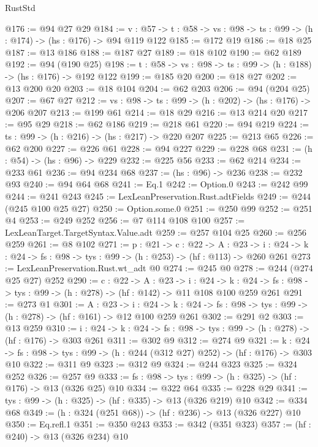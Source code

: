 \begin{lexlean}{RustStd}
\begin{coremodule}
@176 := @94 @27 @29
@184 := {v : @57} ->
  {t : @58} -> {vs : @98} -> {ts : @99} -> (h : @174) -> (hs : @176) -> @94 @119 @122
@185 := @172 @19
@186 := @18 @25
@187 := @13 @186
@188 := @187 @27
@189 := @18 @102
@190 := @62 @189
@192 := @94 (@190 @25)
@198 := {t : @58} -> {vs : @98} -> {ts : @99} -> (h : @188) -> (hs : @176) -> @192 @122
@199 := @185 @20
@200 := @18 @27
@202 := @13 @200 @20
@203 := @18 @104
@204 := @62 @203
@206 := @94 (@204 @25)
@207 := @67 @27
@212 := {vs : @98} -> {ts : @99} -> (h : @202) -> (hs : @176) -> @206 @207
@213 := @199 @61
@214 := @18 @29
@216 := @13 @214 @20
@217 := @95 @29
@218 := @62 @186
@219 := @218 @61
@220 := @94 @219
@224 := {ts : @99} -> (h : @216) -> (hs : @217) -> @220 @207
@225 := @213 @65
@226 := @62 @200
@227 := @226 @61
@228 := @94 @227
@229 := @228 @68
@231 := (h : @54) -> (hs : @96) -> @229
@232 := @225 @56
@233 := @62 @214
@234 := @233 @61
@236 := @94 @234 @68
@237 := (hs : @96) -> @236
@238 := @232 @93
@240 := @94 @64 @68
@241 := Eq.{1}
@242 := Option.{0}
@243 := @242 @99
@244 := @241 @243
@245 := LexLeanPreservation.Rust.adtFields
@249 := @244 (@245 @100 @25 @27)
@250 := Option.some.{0}
@251 := @250 @99
@252 := @251 @4
@253 := @249 @252
@256 := @7 @114 @108 @100
@257 := LexLeanTarget.TargetSyntax.Value.adt
@259 := @257 @104 @25
@260 := @256 @259
@261 := @8 @102
@271 := {p : @21} ->
  {c : @22} ->
  {A : @23} ->
  {i : @24} -> {k : @24} -> {fs : @98} -> {tys : @99} -> (h : @253) -> (hf : @113) -> @260 @261
@273 := LexLeanPreservation.Rust.wt_adt @0
@274 := @245 @0
@278 := @244 (@274 @25 @27) @252
@290 := {c : @22} ->
  {A : @23} ->
  {i : @24} ->
  {k : @24} -> {fs : @98} -> {tys : @99} -> (h : @278) -> (hf : @142) -> @11 @108 @100 @259 @261
@291 := @273 @1
@301 := {A : @23} ->
  {i : @24} ->
  {k : @24} -> {fs : @98} -> {tys : @99} -> (h : @278) -> (hf : @161) -> @12 @100 @259 @261
@302 := @291 @2
@303 := @13 @259
@310 := {i : @24} ->
  {k : @24} -> {fs : @98} -> {tys : @99} -> (h : @278) -> (hf : @176) -> @303 @261
@311 := @302 @9
@312 := @274 @9
@321 := {k : @24} ->
  {fs : @98} -> {tys : @99} -> (h : @244 (@312 @27) @252) -> (hf : @176) -> @303 @10
@322 := @311 @9
@323 := @312 @9
@324 := @244 @323
@325 := @324 @252
@326 := @257 @9
@333 := {fs : @98} -> {tys : @99} -> (h : @325) -> (hf : @176) -> @13 (@326 @25) @10
@334 := @322 @64
@335 := @228 @29
@341 := {tys : @99} -> (h : @325) -> (hf : @335) -> @13 (@326 @219) @10
@342 := @334 @68
@349 := (h : @324 (@251 @68)) -> (hf : @236) -> @13 (@326 @227) @10
@350 := Eq.refl.{1}
@351 := @350 @243
@353 := @342 (@351 @323)
@357 := (hf : @240) -> @13 (@326 @234) @10

\end{coremodule}
\end{lexlean}
